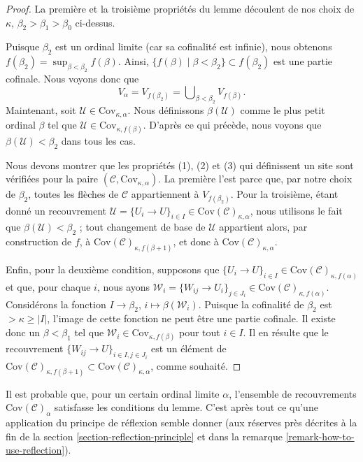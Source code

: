 \begin{proof}
\medskip\noindent
La première et la troisième propriétés du lemme découlent de nos choix de
$\kappa$, $\beta_2 > \beta_1 > \beta_0$ ci-dessus.

\medskip\noindent
Puisque $\beta_2$ est un ordinal limite (car sa cofinalité est infinie), nous
obtenons $f(\beta_2) = \sup_{\beta < \beta_2} f(\beta)$.
Ainsi, $\{f(\beta) \mid \beta < \beta_2\} \subset f(\beta_2)$ est une partie
cofinale. Nous voyons donc que
$$
V_\alpha = V_{f(\beta_2)} = \bigcup\nolimits_{\beta < \beta_2} V_{f(\beta)}.
$$
Maintenant, soit $\mathcal{U} \in \text{Cov}_{\kappa, \alpha}$.
Nous définissons $\beta(\mathcal{U})$ comme le plus petit ordinal $\beta$ tel
que $\mathcal{U} \in \text{Cov}_{\kappa, f(\beta)}$. D'après ce qui précède,
nous voyons que $\beta(\mathcal{U}) < \beta_2$ dans tous les cas.

\medskip\noindent
Nous devons montrer que les propriétés (1), (2) et (3) qui définissent un site
sont vérifiées pour la paire
$(\mathcal{C}, \text{Cov}_{\kappa, \alpha})$.
La première l'est parce que, par notre choix de $\beta_2$, toutes les flèches
de $\mathcal{C}$ appartiennent à $V_{f(\beta_2)}$.
Pour la troisième, étant donné un recouvrement
$\mathcal{U} = \{U_i \to U\}_{i \in I}
\in \text{Cov}(\mathcal{C})_{\kappa, \alpha}$, nous utilisons le fait que
$\beta(\mathcal{U}) < \beta_2$ ; tout changement de base de $\mathcal{U}$
appartient alors, par construction de $f$, à
$\text{Cov}(\mathcal{C})_{\kappa, f(\beta + 1)}$, et donc à
$\text{Cov}(\mathcal{C})_{\kappa, \alpha}$.

\medskip\noindent
Enfin, pour la deuxième condition, supposons que
$\{U_i \to U\}_{i\in I}
\in \text{Cov}(\mathcal{C})_{\kappa, f(\alpha)}$ et que, pour chaque $i$,
nous ayons
$\mathcal{W}_i = \{W_{ij} \to U_i\}_{j\in J_i}
\in \text{Cov}(\mathcal{C})_{\kappa, f(\alpha)}$.
Considérons la fonction
$I \to \beta_2$, $i \mapsto \beta(\mathcal{W}_i)$. Puisque la cofinalité
de $\beta_2$ est $> \kappa \geq |I|$, l'image de cette fonction ne peut être
une partie cofinale. Il existe donc un $\beta < \beta_1$ tel que
$\mathcal{W}_i \in \text{Cov}_{\kappa, f(\beta)}$ pour tout $i \in I$.
Il en résulte que le recouvrement
$\{W_{ij} \to U\}_{i\in I, j \in J_i}$ est un élément de
$\text{Cov}(\mathcal{C})_{\kappa, f(\beta + 1)}
\subset \text{Cov}(\mathcal{C})_{\kappa, \alpha}$, comme souhaité.
\end{proof}

\begin{remark}
\label{remark-better}
Il est probable que, pour un certain ordinal limite $\alpha$, l'ensemble de
recouvrements $\text{Cov}(\mathcal{C})_\alpha$ satisfasse les conditions du
lemme. C'est après tout ce qu'une application du principe de réflexion semble
donner (aux réserves près décrites à la fin de la
section \ref{section-reflection-principle} et dans la
remarque \ref{remark-how-to-use-reflection}).
\end{remark}








